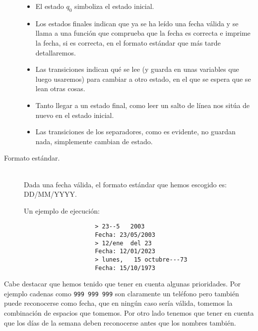 \documentclass[12pt]{article}
\begin{document}
\begin{description}
\begin{figure}[H]
                \label{fig:diagrama}
            \end{figure}
            \begin{itemize}
                \item El estado $q_0$ simboliza el estado inicial. 
                \item Los estados finales indican que ya se ha leído una fecha válida y se llama a una función que comprueba que la fecha es correcta e imprime la fecha, si es correcta, en el formato estándar que más tarde detallaremos.
                \item Las transiciones indican qué se lee (y guarda en unas variables que luego usaremos) para cambiar a otro estado, en el que se espera que se lean otras cosas. 
                \item Tanto llegar a un estado final, como leer un salto de línea nos sitúa de nuevo en el estado inicial.
                \item Las transiciones de los separadores, como es evidente, no guardan nada, simplemente cambian de estado.
            \end{itemize}

        \item [Formato estándar.]~\\
            Dada una fecha válida, el formato estándar que hemos escogido es: DD/MM/YYYY\@.
            \begin{ejemplo}
                Un ejemplo de ejecución:
                \begin{verbatim}
                    > 23--5   2003
                    Fecha: 23/05/2003
                    > 12/ene  del 23
                    Fecha: 12/01/2023
                    > lunes,   15 octubre---73
                    Fecha: 15/10/1973
                \end{verbatim}

            \end{ejemplo}
            
    \end{description}

    \begin{observacion}
        Cabe destacar que hemos tenido que tener en cuenta algunas prioridades. Por ejemplo cadenas como \verb|999 999 999| son claramente un teléfono pero también puede reconocerse como fecha, que en ningún caso sería válida, tomemos la combinación de espacios que tomemos. Por otro lado tenemos que tener en cuenta que los días de la semana deben reconocerse antes que los nombres también. 
    \end{observacion}
    


    \newpage

    \fancyhead[R]{\helv \nouppercase{\rightmark}}
\end{document}
